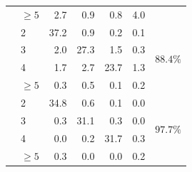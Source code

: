 \begin{tabular}{llrrrrr}
 & $\geq 5$ & 2.7 & 0.9 & 0.8 & 4.0 &  \\
\addlinespace
\multirow{4}{*}{6} & 2 & 37.2 & 0.9 & 0.2 & 0.1 & \multirow{4}{*}{$88.4\%$} \\
 & 3 & 2.0 & 27.3 & 1.5 & 0.3 &  \\
 & 4 & 1.7 & 2.7 & 23.7 & 1.3 &  \\
 & $\geq 5$ & 0.3 & 0.5 & 0.1 & 0.2 &  \\
\addlinespace
\multirow{4}{*}{10} & 2 & 34.8 & 0.6 & 0.1 & 0.0 & \multirow{4}{*}{$97.7\%$} \\
 & 3 & 0.3 & 31.1 & 0.3 & 0.0 &  \\
 & 4 & 0.0 & 0.2 & 31.7 & 0.3 &  \\
 & $\geq 5$ & 0.3 & 0.0 & 0.0 & 0.2 &  \\
\bottomrule
\end{tabular}
